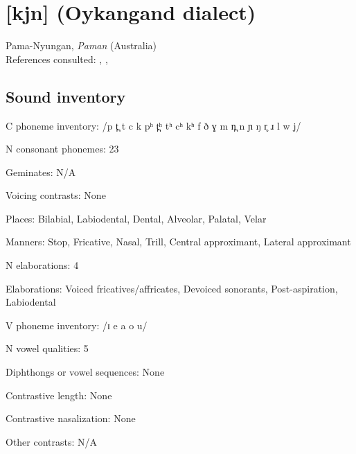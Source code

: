 {\section*{[kjn]  (Oykangand dialect)}   %
Pama-Nyungan, \textit{Paman} (Australia)\medskip\\
References consulted: \citet{Dixon1970}, \citet{Sommer1969}, \citet{Sommer1981}

\subsection*{Sound inventory}
\begin{appendixdesc}

\item[C phoneme inventory:] /p t̪ t c k pʰ t̪ʰ tʰ cʰ kʰ f ð ɣ m n̪ n ɲ ŋ r̥ ɹ l w j/

\item[N consonant phonemes:] 23

\item[Geminates:] N/A

\item[Voicing contrasts:] None

\item[Places:] Bilabial, Labiodental, Dental, Alveolar, Palatal, Velar

\item[Manners:] Stop, Fricative, Nasal, Trill, Central approximant, Lateral approximant

\item[N elaborations:] 4

\item[Elaborations:] Voiced fricatives/affricates, Devoiced sonorants, Post-aspiration, Labiodental

\item[V phoneme inventory:] /ɪ e a o u/

\item[N vowel qualities:] 5

\item[Diphthongs or vowel sequences:] None

\item[Contrastive length:] None

\item[Contrastive nasalization:] None

\item[Other contrasts:] N/A


\end{appendixdesc}}
